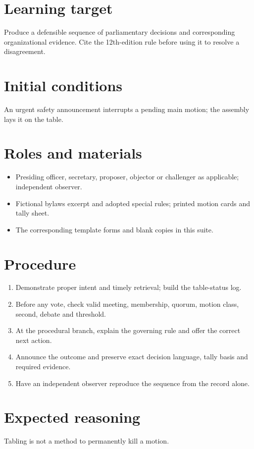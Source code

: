 \documentclass[11pt]{article}
\begin{document}
\SuiteOpen
\section{Learning target}
Produce a defensible sequence of parliamentary decisions and corresponding organizational evidence. Cite the 12th-edition rule before using it to resolve a disagreement.

\section{Initial conditions}
An urgent safety announcement interrupts a pending main motion; the assembly lays it on the table.

\section{Roles and materials}
\begin{itemize}[leftmargin=*,itemsep=4pt]
\item Presiding officer, secretary, proposer, objector or challenger as applicable; independent observer.
\item Fictional bylaws excerpt and adopted special rules; printed motion cards and tally sheet.
\item The corresponding template forms and blank copies in this suite.
\end{itemize}

\section{Procedure}
\begin{enumerate}[leftmargin=*,itemsep=4pt]
\item Demonstrate proper intent and timely retrieval; build the table-status log.
\item Before any vote, check valid meeting, membership, quorum, motion class, second, debate and threshold.
\item At the procedural branch, explain the governing rule and offer the correct next action.
\item Announce the outcome and preserve exact decision language, tally basis and required evidence.
\item Have an independent observer reproduce the sequence from the record alone.
\end{enumerate}

\section{Expected reasoning}
Tabling is not a method to permanently kill a motion.
\end{document}
